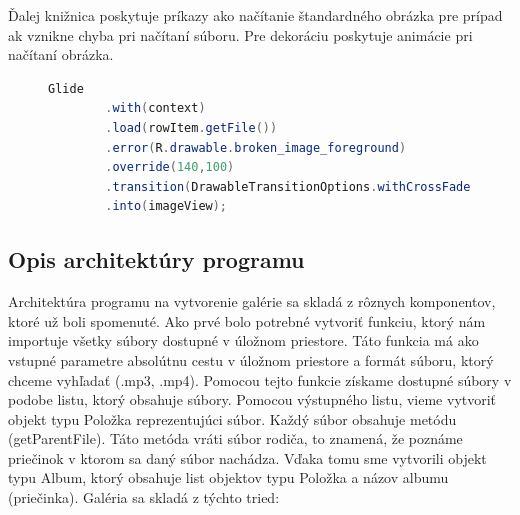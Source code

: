 \documentclass[12pt, oneside]{book}
\begin{document}
Ďalej knižnica poskytuje príkazy ako načítanie štandardného obrázka pre prípad ak vznikne chyba pri načítaní súboru. Pre dekoráciu poskytuje animácie pri načítaní obrázka.


\begin{figure}[H]
\begin{lstlisting}[language=Java, caption=Príklad na načítanie obrázkov použitím knižnice Glide.]
 Glide
        .with(context)
        .load(rowItem.getFile())
        .error(R.drawable.broken_image_foreground)
        .override(140,100)
        .transition(DrawableTransitionOptions.withCrossFade(750))
        .into(imageView);
\end{lstlisting}
\end{figure}

\subsection{Opis architektúry programu}

\hspace{15pt} Architektúra programu na vytvorenie galérie sa skladá z rôznych komponentov, ktoré už boli spomenuté. Ako prvé bolo potrebné vytvoriť funkciu, ktorý nám importuje všetky súbory dostupné v úložnom priestore. Táto funkcia má ako vstupné  parametre absolútnu cestu v úložnom priestore a formát súboru, ktorý chceme vyhľadať (.mp3, .mp4). Pomocou tejto funkcie získame dostupné súbory v podobe listu, ktorý obsahuje súbory. Pomocou výstupného listu, vieme vytvoriť objekt typu Položka reprezentujúci súbor. Každý súbor obsahuje metódu (getParentFile). Táto metóda vráti súbor rodiča, to znamená, že poznáme priečinok v ktorom sa daný súbor nachádza. Vďaka tomu sme vytvorili objekt typu Album, ktorý obsahuje list objektov typu Položka a názov albumu (priečinka). 
Galéria sa skladá z týchto tried:
\end{document}
